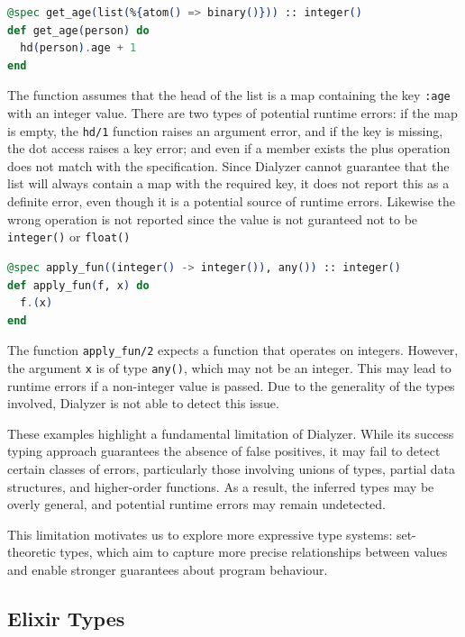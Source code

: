 \begin{lstlisting}[language=Elixir, firstnumber=last]
@spec get_age(list(%{atom() => binary()})) :: integer()
def get_age(person) do
  hd(person).age + 1
end
\end{lstlisting}

The function assumes that the head of the list is a map containing the key \texttt{:age} with an integer value.
There are two types of potential runtime errors: if the map is empty, the \texttt{hd/1} function raises an argument error, and if the key is missing, the dot access raises a key error; and even if a member exists the plus operation does not match with the specification.
Since Dialyzer cannot guarantee that the list will always contain a map with the required key, it does not report this as a definite error, even though it is a potential source of runtime errors. Likewise the wrong operation is not reported since the value is not guranteed not to be \texttt{integer()} or \texttt{float()}

\begin{lstlisting}[language=Elixir, firstnumber=last]
@spec apply_fun((integer() -> integer()), any()) :: integer()
def apply_fun(f, x) do
  f.(x)
end
\end{lstlisting}

The function \texttt{apply\_fun/2} expects a function that operates on integers.
However, the argument \texttt{x} is of type \texttt{any()}, which may not be an integer.
This may lead to runtime errors if a non-integer value is passed.
Due to the generality of the types involved, Dialyzer is not able to detect this issue.


These examples highlight a fundamental limitation of Dialyzer.
While its success typing approach guarantees the absence of false positives, it may fail to detect certain classes of errors, particularly those involving unions of types, partial data structures, and higher-order functions.
As a result, the inferred types may be overly general, and potential runtime errors may remain undetected.

This limitation motivates us to explore more expressive type systems: set-theoretic types, which aim to capture more precise relationships between values and enable stronger guarantees about program behaviour.

\subsection{Elixir Types}

